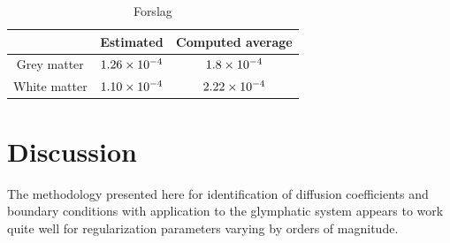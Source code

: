 \documentclass[12pt,a4paper]{article}
\newcommand{\fixme}[1]{\textcolor{orange}{#1}}
\begin{document}
\begin{table}\centering
\begin{tabular}{|ccc|}
\hline
   & Estimated & Computed average\\
\hline
Grey matter  & $ 1.26\times 10\sp{-4}$   &  $1.8\times 10\sp{-4}$  \\
White matter & $ 1.10\times 10\sp{-4}$   &  $2.22\times 10\sp{-4}$  \\
\hline
\end{tabular}
\caption{Forslag}
\label{Tablesummerized}
\end{table}

\section{Discussion}
The methodology presented here for identification of diffusion coefficients and boundary conditions with application to the glymphatic system appears to work quite 
well for regularization parameters varying by orders of magnitude. 
\end{document}
